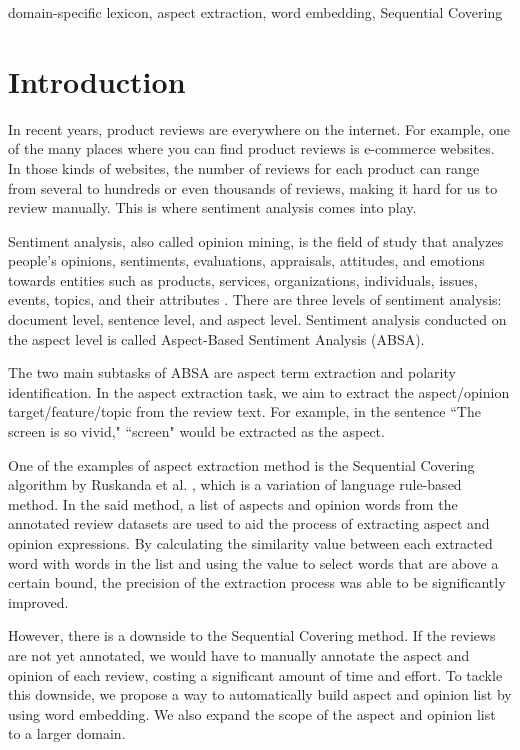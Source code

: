\documentclass[a4paper,conference]{IEEEtran}
\begin{document}
\begin{IEEEkeywords}
domain-specific lexicon, aspect extraction, word embedding, Sequential Covering
\end{IEEEkeywords}

\section{Introduction}
In recent years, product reviews are everywhere on the internet. For example, one of the many places where you can find product reviews is e-commerce websites. In those kinds of websites, the number of reviews for each product can range from several to hundreds or even thousands of reviews, making it hard for us to review manually. This is where sentiment analysis comes into play.

Sentiment analysis, also called opinion mining, is the field of study that analyzes people’s opinions, sentiments, evaluations, appraisals, attitudes, and emotions towards entities such as products, services, organizations, individuals, issues, events, topics, and their attributes \cite{b1}. There are three levels of sentiment analysis: document level, sentence level, and aspect level. Sentiment analysis conducted on the aspect level is called Aspect-Based Sentiment Analysis (ABSA).

The two main subtasks of ABSA are aspect term extraction and polarity identification. In the aspect extraction task, we aim to extract the aspect/opinion target/feature/topic from the review text. For example, in the sentence ``The screen is so vivid," ``screen" would be extracted as the aspect. 

One of the examples of aspect extraction method is the Sequential Covering algorithm by Ruskanda et al. \cite{b2}, which is a variation of language rule-based method. In the said method, a list of aspects and opinion words from the annotated review datasets are used to aid the process of extracting aspect and opinion expressions. By calculating the similarity value between each extracted word with words in the list and using the value to select words that are above a certain bound, the precision of the extraction process was able to be significantly improved.

However, there is a downside to the Sequential Covering method.  If the reviews are not yet annotated, we would have to manually annotate the aspect and opinion of each review, costing a significant amount of time and effort. To tackle this downside, we propose a way to automatically build aspect and opinion list by using word embedding. We also expand the scope of the aspect and opinion list to a larger domain.
\end{document}
